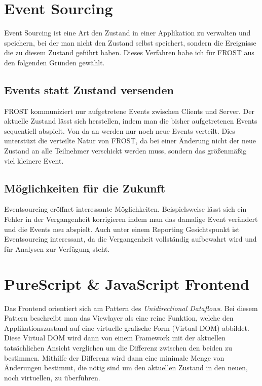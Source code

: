 \clearpage
\section{Event Sourcing}
Event Sourcing ist eine Art den Zustand in einer Applikation zu verwalten und
speichern, bei der man nicht den Zustand selbst speichert, sondern die
Ereignisse die zu diesem Zustand geführt haben. Dieses Verfahren habe ich für
FROST aus den folgenden Gründen gewählt.

\subsection*{Events statt Zustand versenden}
FROST kommuniziert nur aufgetretene Events zwischen Clients und Server. Der
aktuelle Zustand lässt sich herstellen, indem man die bisher aufgetretenen
Events sequentiell abspielt. Von da an werden nur noch neue Events verteilt.
Dies unterstüzt die verteilte Natur von FROST, da bei einer Änderung nicht der
neue Zustand an alle Teilnehmer verschickt werden muss, sondern das größenmäßig
viel kleinere Event.

\subsection*{Möglichkeiten für die Zukunft}
Eventsourcing eröffnet interessante Möglichkeiten. Beispielsweise lässt sich ein
Fehler in der Vergangenheit korrigieren indem man das damalige Event verändert
und die Events neu abspielt. Auch unter einem Reporting Gesichtspunkt ist
Eventsourcing interessant, da die Vergangenheit vollständig aufbewahrt wird und
für Analysen zur Verfügung steht.


\section{PureScript \& JavaScript Frontend}
\label{sec:frontend}
Das Frontend orientiert sich am Pattern des \textit{Unidirectional Dataflows}.
Bei diesem Pattern beschreibt man das Viewlayer als eine reine Funktion, welche
den Applikationszustand auf eine virtuelle grafische Form (Virtual DOM)
abbildet. Diese Virtual DOM wird dann von einem Framework mit der aktuellen
tatsächlichen Ansicht verglichen um die Differenz zwischen den beiden zu
bestimmen. Mithilfe der Differenz wird dann eine minimale Menge von Änderungen
bestimmt, die nötig sind um den aktuellen Zustand in den neuen, noch
virtuellen, zu überführen.

